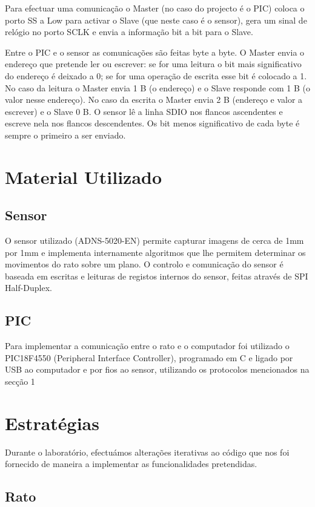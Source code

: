\documentclass[a4paper]{article}
\begin{document}
Para efectuar uma comunicação o Master (no caso do projecto é o PIC) coloca o porto SS a Low para activar o Slave (que neste caso é o sensor), gera um sinal de relógio no porto SCLK e envia a informação bit a bit para o Slave.

Entre o PIC e o sensor as comunicações são feitas byte a byte. O Master envia o endereço que pretende ler ou escrever: se for uma leitura o bit mais significativo do endereço é deixado a 0; se for uma operação de escrita esse bit é colocado a 1. No caso da leitura o Master envia 1 B (o endereço) e o Slave responde com 1 B (o valor nesse endereço). No caso da escrita o Master envia 2 B (endereço e valor a escrever) e o Slave 0 B. O sensor lê a linha SDIO nos flancos ascendentes e escreve nela nos flancos descendentes. Os bit menos significativo de cada byte é sempre o primeiro a ser enviado.

\section{Material Utilizado}
 \subsection{Sensor}
O sensor utilizado (ADNS-5020-EN) permite capturar imagens de cerca de 1mm por 1mm e implementa internamente algoritmos que lhe permitem determinar os movimentos do rato sobre um plano. O controlo e comunicação do sensor é baseada em escritas e leituras de registos internos do sensor, feitas através de SPI Half-Duplex.

\subsection{PIC}
Para implementar a comunicação entre o rato e o computador foi utilizado o PIC18F4550 (Peripheral Interface Controller), programado em C e ligado por USB ao computador e por fios ao sensor, utilizando os protocolos mencionados na secção 1

\section{Estratégias}
Durante o laboratório, efectuámos alterações iterativas ao código que nos foi fornecido de maneira a implementar as funcionalidades pretendidas.

\subsection{Rato}
\end{document}
